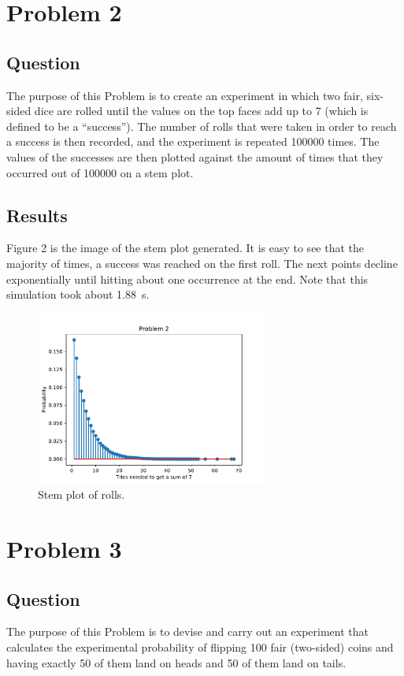 \documentclass{article}
\begin{document}
\section{Problem 2}
\subsection{Question} The purpose of this Problem is to
create an experiment in which two fair, six-sided dice
are rolled until the values on the top faces add up to
\num{7} (which is defined to be a ``success'').
The number of rolls that were taken in order to reach a
success is then recorded, and the experiment is repeated
\num{100000} times. The values of the successes are then
plotted against the amount of times that they occurred out of
\num{100000} on a stem plot.

\subsection{Results} Figure 2 is the image of the stem plot
generated. It is easy to see that the majority of times,
a success was reached on the first roll. The next points
decline exponentially until hitting about one occurrence
at the end. Note that this simulation took about \SI{1.88}{s}.

\begin{figure}[H]
    \centering
    \includegraphics[height=162pt]{Images/Problem2}
    \caption{Stem plot of rolls.}
    \label{prob2}
\end{figure}

\section{Problem 3}
\subsection{Question} The purpose of this Problem is to devise
and carry out an experiment that calculates the experimental
probability of flipping 100 fair (two-sided) coins and having
exactly \num{50} of them land on heads and \num{50} of them
land on tails.
\end{document}
